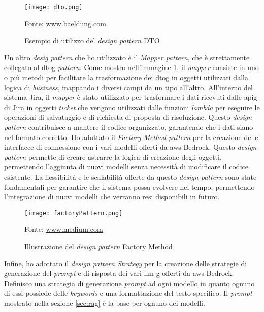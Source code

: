 \begin{figure}[H]
    \centering
    \texttt{[image: dto.png]}
    \caption{Esempio di utilizzo del \textit{design pattern} DTO}
    \small Fonte: \href{https://www.baeldung.com/java-dto-pattern} {www.baeldung.com}
    \label{fig:dto}
\end{figure}
\noindent
Un altro \textit{desig pattern} che ho utilizzato è il \textit{Mapper pattern}, che è strettamente collegato al \gls{dtog} \textit{pattern}.  Come mostro nell'immagine \ref{fig:dto}, il \textit{mapper} consiste in uno o più metodi per facilitare la trasformazione dei \gls{dtog} in oggetti utilizzati dalla logica di \textit{business}, mappando i diversi campi da un tipo all’altro. All'interno del sistema Jira, il \textit{mapper} è stato utilizzato per trasformare i dati ricevuti dalle \gls{apig} di Jira in oggetti \textit{ticket} che vengono utilizzati dalle funzioni \textit{lambda} per eseguire le operazioni di salvataggio e di richiesta di proposta di risoluzione.
Questo \textit{design pattern} contribuisce a mantere il codice organizzato, garantendo che i dati siano nel formato corretto. Ho adottato il \textit{Factory Method pattern} per la creazione delle interfacce di connessione con i vari modelli offerti da \gls{aws} Bedrock. Questo \textit{design pattern} permette di creare astrarre la logica di creazione degli oggetti, permettendo l'aggiunta di nuovi modelli senza necessità di modificare il codice esistente. La flessibilità e le scalabilità
offerte da questo \textit{design pattern} sono state fondamentali per garantire che il sistema possa evolvere nel tempo, permettendo l'integrazione di nuovi modelli che verranno resi disponibili in futuro. 
\begin{figure}[H]
    \centering
    \texttt{[image: factoryPattern.png]}
    \caption{Illustrazione del \textit{design pattern} Factory Method}
    \small Fonte: \href{https://medium.com/@contactkumaramit9139/factory-design-pattern-in-java-baee365fc1ce} {www.medium.com}
    \label{fig:factory}
\end{figure}
\noindent
Infine, ho adottato il \textit{design pattern Strategy} per la creazione delle strategie di generazione del \textit{prompt} e di risposta dei vari \gls{llm-g} offerti da \gls{aws} Bedrock. Definisco una strategia di generazione \textit{prompt} ad ogni modello in quanto ognuno di essi possiede delle \textit{keywords} e una formattazione del testo specifico. Il \textit{prompt} mostrato nella sezione \ref{sec:rag} è la base per ognuno dei modelli. 

